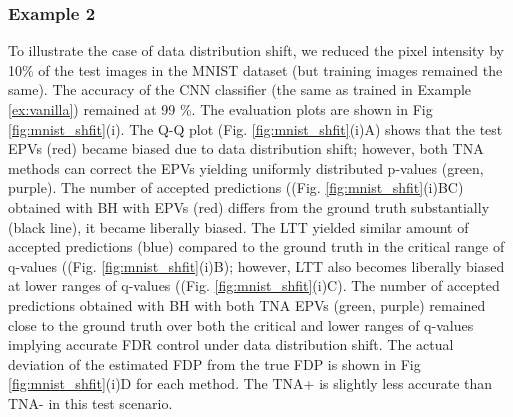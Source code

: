 \documentclass[10pt,letterpaper]{article}
\begin{document}
	
\subsubsection*{Example 2} To illustrate the case of data distribution shift, we reduced the pixel intensity by 10\% of the test images in the MNIST dataset (but training images remained the same).
The accuracy of the CNN classifier (the same as trained in Example \ref{ex:vanilla}) remained at 99 \%.
The evaluation plots are shown in Fig \ref{fig:mnist_shfit}(i).
The Q-Q plot (Fig. \ref{fig:mnist_shfit}(i)A) shows that the test EPVs (red) became biased due to data distribution shift; however, both TNA methods can correct the EPVs yielding uniformly distributed p-values (green, purple).
The number of accepted predictions ((Fig. \ref{fig:mnist_shfit}(i)BC) obtained with BH with EPVs (red) differs from the ground truth substantially (black line), it became liberally biased.
The LTT yielded similar amount of accepted predictions (blue) compared to the ground truth in the critical range of q-values ((Fig. \ref{fig:mnist_shfit}(i)B); however, LTT also becomes liberally biased at lower ranges of q-values ((Fig. \ref{fig:mnist_shfit}(i)C).
The number of accepted predictions obtained with BH with both TNA EPVs (green, purple) remained close to the ground truth over both the critical and lower ranges of q-values implying accurate FDR control under data distribution shift.
The actual deviation of the estimated FDP from the true FDP is shown in Fig \ref{fig:mnist_shfit}(i)D for each method.
The TNA+ is slightly less accurate than TNA- in this test scenario.
\end{document}
